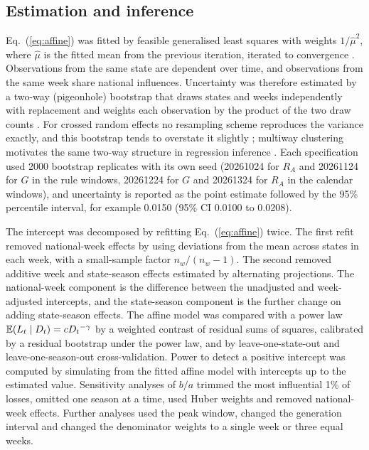 \subsection{Estimation and inference}
\label{sec:meth-inference}

Eq.~(\ref{eq:affine}) was fitted by feasible generalised least squares with weights $1/\hat{\mu}^2$, where $\hat{\mu}$ is the fitted mean from the previous iteration, iterated to convergence \citep{wooldridge2010econometric}. Observations from the same state are dependent over time, and observations from the same week share national influences. Uncertainty was therefore estimated by a two-way (pigeonhole) bootstrap that draws states and weeks independently with replacement and weights each observation by the product of the two draw counts \citep{owen2007pigeonhole}. For crossed random effects no resampling scheme reproduces the variance exactly, and this bootstrap tends to overstate it slightly \citep{mccullagh2000resampling, owen2007pigeonhole}; multiway clustering motivates the same two-way structure in regression inference \citep{cameron2008bootstrap, cameron2011robust}. Each specification used 2000 bootstrap replicates with its own seed (20261024 for $R_A$ and 20261124 for $G$ in the rule windows, 20261224 for $G$ and 20261324 for $R_A$ in the calendar windows), and uncertainty is reported as the point estimate followed by the 95\% percentile interval, for example 0.0150 (95\% CI 0.0100 to 0.0208).

The intercept was decomposed by refitting Eq.~(\ref{eq:affine}) twice. The first refit removed national-week effects by using deviations from the mean across states in each week, with a small-sample factor $n_w/(n_w-1)$. The second removed additive week and state-season effects estimated by alternating projections. The national-week component is the difference between the unadjusted and week-adjusted intercepts, and the state-season component is the further change on adding state-season effects. The affine model was compared with a power law $\mathbb{E}(L_t\mid D_t)=cD_t{}^{-\gamma}$ by a weighted contrast of residual sums of squares, calibrated by a residual bootstrap under the power law, and by leave-one-state-out and leave-one-season-out cross-validation. Power to detect a positive intercept was computed by simulating from the fitted affine model with intercepts up to the estimated value. Sensitivity analyses of $b/a$ trimmed the most influential 1\% of losses, omitted one season at a time, used Huber weights and removed national-week effects. Further analyses used the peak window, changed the generation interval and changed the denominator weights to a single week or three equal weeks.

